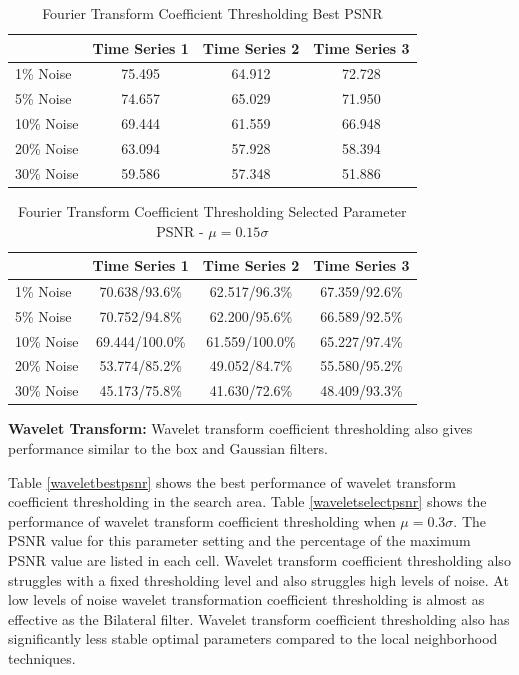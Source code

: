 \documentclass[11pt]{article}
\newcommand{\vs}{\vspace{0.1in}}
\theoremstyle{definition}
\begin{document}
\begin{table}[!h]
\small
\begin{center}
\begin{tabular}{l | c | c | c}
 & Time Series 1 & Time Series 2 & Time Series 3 \\ \hline
1\% Noise & 75.495 & 64.912 & 72.728 \\ \hline
5\% Noise & 74.657 & 65.029 & 71.950 \\ \hline
10\% Noise & 69.444 & 61.559 & 66.948 \\ \hline
20\% Noise & 63.094 & 57.928 & 58.394 \\ \hline
30\% Noise & 59.586 & 57.348 & 51.886
\end{tabular}
\caption{Fourier Transform Coefficient Thresholding Best PSNR}
\label{fftbestpsnr}
\end{center}
\end{table}

\begin{table}[!h]
\small
\begin{center}
\begin{tabular}{l | c | c | c}
 & Time Series 1 & Time Series 2 & Time Series 3 \\ \hline
1\% Noise & 70.638/93.6\% & 62.517/96.3\% & 67.359/92.6\% \\ \hline
5\% Noise & 70.752/94.8\% & 62.200/95.6\% & 66.589/92.5\% \\ \hline
10\% Noise & 69.444/100.0\% & 61.559/100.0\% & 65.227/97.4\% \\ \hline
20\% Noise & 53.774/85.2\% & 49.052/84.7\% & 55.580/95.2\% \\ \hline
30\% Noise & 45.173/75.8\% & 41.630/72.6\% & 48.409/93.3\%
\end{tabular}
\caption{Fourier Transform Coefficient Thresholding Selected Parameter PSNR - $\mu = 0.15 \sigma$}
\label{fftselectpsnr}
\end{center}
\end{table}

\vs
\noindent
\textbf{Wavelet Transform:} Wavelet transform coefficient thresholding also gives performance similar to the box and Gaussian filters.

Table \ref{waveletbestpsnr} shows the best performance of wavelet transform coefficient thresholding in the search area. Table \ref{waveletselectpsnr} shows the performance of wavelet transform coefficient thresholding when $\mu = 0.3 \sigma$. The PSNR value for this parameter setting and the percentage of the maximum PSNR value are listed in each cell. Wavelet transform coefficient thresholding also struggles with a fixed thresholding level and also struggles high levels of noise. At low levels of noise wavelet transformation coefficient thresholding is almost as effective as the Bilateral filter. Wavelet transform coefficient thresholding also has significantly less stable optimal parameters compared to the local neighborhood techniques.
\end{document}
